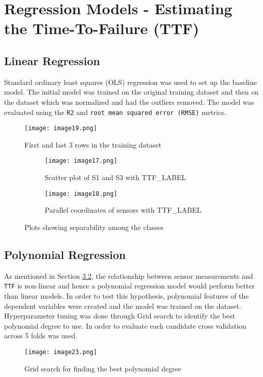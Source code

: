 \documentclass{article}
\begin{document}
\section{Regression Models - Estimating the Time-To-Failure (TTF)}
\subsection{Linear Regression}
Standard ordinary least squares (OLS) regression was used to set up the baseline model.
The initial model was trained on the original training dataset and then on the dataset which was normalized and had the outliers removed.
The model was evaluated using the \texttt{R2} and \texttt{root mean squared error (RMSE)} metrics.

\begin{figure}[h]
	\centering
	\texttt{[image: image19.png]}
	\caption{First and last 3 rows in the training dataset}
\end{figure}

\begin{figure}[h]
	\begin{subfigure}{.5\textwidth}
		\centering
		\texttt{[image: image17.png]}
		\caption{Scatter plot of S1 and S3 with TTF\_LABEL}
		\label{fig:sfig1}
	\end{subfigure}%
	\begin{subfigure}{.5\textwidth}
		\centering
		\texttt{[image: image18.png]}
		\caption{Parallel coordinates of sensors with TTF\_LABEL}
		\label{fig:sfig2}
	\end{subfigure}
	\caption{Plots showing separability among the classes}
	\label{fig:fig}
\end{figure}
\subsection{Polynomial Regression}
As mentioned in Section \hyperref[sec:visual-eda]{3.2}, the relationship between sensor measurements and \texttt{TTF} is non-linear and hence a polynomial regression model would perform better than linear models.
In order to test this hypothesis, polynomial features of the dependent variables were created and the model was trained on the dataset.
Hyperparameter tuning was done through Grid search to identify the best polynomial degree to use. In order to evaluate each candidate cross validation across 5 folds was used.
\begin{figure}[h]
	\centering
	\texttt{[image: image23.png]}
	\caption{Grid search for finding the best polynomial degree}
\end{figure}
\end{document}
